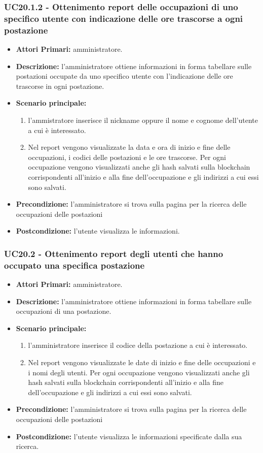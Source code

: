 \subsubsection{ UC20.1.2 - Ottenimento report delle occupazioni di uno specifico utente con indicazione delle ore trascorse a ogni postazione}
\begin{itemize}
	\item\textbf{Attori Primari:} 
	amministratore.
	\item\textbf{Descrizione:} 
	l'amministratore ottiene informazioni in forma tabellare sulle postazioni occupate da uno specifico utente con l'indicazione delle ore trascorse in ogni postazione.
	\item\textbf{Scenario principale:}
	\begin{enumerate}
		\item l'ammistratore inserisce il nickname oppure il nome e cognome dell'utente a cui è interessato.
		\item Nel report vengono visualizzate la data e ora di inizio e fine delle occupazioni, i codici delle postazioni e le ore trascorse.
		Per ogni occupazione vengono visualizzati anche gli hash salvati sulla blockchain corrispondenti all'inizio e alla fine dell'occupazione e gli indirizzi a cui essi sono salvati.
	\end{enumerate}
	\item\textbf{Precondizione:} 
	l'amministratore si trova sulla pagina per la ricerca delle occupazioni delle postazioni
	\item\textbf{Postcondizione:}
	l'utente visualizza le informazioni.
\end{itemize}

\subsubsection{ UC20.2 - Ottenimento report degli utenti che hanno occupato una specifica postazione}
\begin{itemize}
	\item\textbf{Attori Primari:} 
	amministratore.
	\item\textbf{Descrizione:} 
	l'amministratore ottiene informazioni in forma tabellare sulle occupazioni di una postazione.
	\item\textbf{Scenario principale:} 
	\begin{enumerate}
		\item l'amministratore inserisce il codice della postazione a cui è interessato.
		\item Nel report vengono visualizzate le date di inizio e fine delle occupazioni e i nomi degli utenti. Per ogni occupazione vengono visualizzati anche gli hash salvati sulla blockchain corrispondenti all'inizio e alla fine dell'occupazione e gli indirizzi a cui essi sono salvati.
	\end{enumerate}
	\item\textbf{Precondizione:} 
	l'amministratore si trova sulla pagina per la ricerca delle occupazioni delle postazioni
	\item\textbf{Postcondizione:}
	l'utente visualizza le informazioni specificate dalla sua ricerca.
\end{itemize}


